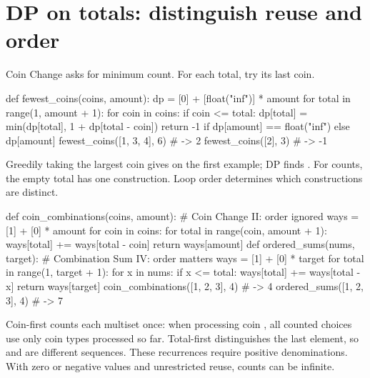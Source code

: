 \documentclass[11pt]{article}
\newcommand{\cd}[1]{{\frenchspacing\texttt{\detokenize{#1}}}}
\begin{document}
\section{DP on totals: distinguish reuse and order}\label{sec:totals}
Coin Change asks for minimum count. For each total, try its last coin.
\par\noindent\begin{minipage}{\linewidth}
\hypertarget{example-start-53}{}
\begin{pyex}
def fewest_coins(coins, amount):
    dp = [0] + [float("inf")] * amount
    for total in range(1, amount + 1):
        for coin in coins:
            if coin <= total:
                dp[total] = min(dp[total], 1 + dp[total - coin])
    return -1 if dp[amount] == float("inf") else dp[amount]
fewest_coins([1, 3, 4], 6)           # -> 2
fewest_coins([2], 3)                 # -> -1
\end{pyex}
\hypertarget{example-end-53}{}
\end{minipage}\par
Greedily taking the largest coin gives \cd{4+1+1} on the first example; DP finds \cd{3+3}.
For counts, the empty total has one construction. Loop order determines which constructions are distinct.
\par\noindent\begin{minipage}{\linewidth}
\hypertarget{example-start-54}{}
\begin{pyex}
def coin_combinations(coins, amount):  # Coin Change II: order ignored
    ways = [1] + [0] * amount
    for coin in coins:
        for total in range(coin, amount + 1):
            ways[total] += ways[total - coin]
    return ways[amount]
def ordered_sums(nums, target):       # Combination Sum IV: order matters
    ways = [1] + [0] * target
    for total in range(1, target + 1):
        for x in nums:
            if x <= total:
                ways[total] += ways[total - x]
    return ways[target]
coin_combinations([1, 2, 3], 4)      # -> 4
ordered_sums([1, 2, 3], 4)           # -> 7
\end{pyex}
\hypertarget{example-end-54}{}
\end{minipage}\par
Coin-first counts each multiset once: when processing coin \cd{c}, all counted choices use only coin types processed so far.
Total-first distinguishes the last element, so \cd{1+3} and \cd{3+1} are different sequences.
These recurrences require positive denominations. With zero or negative values and unrestricted reuse, counts can be infinite.
\end{document}
